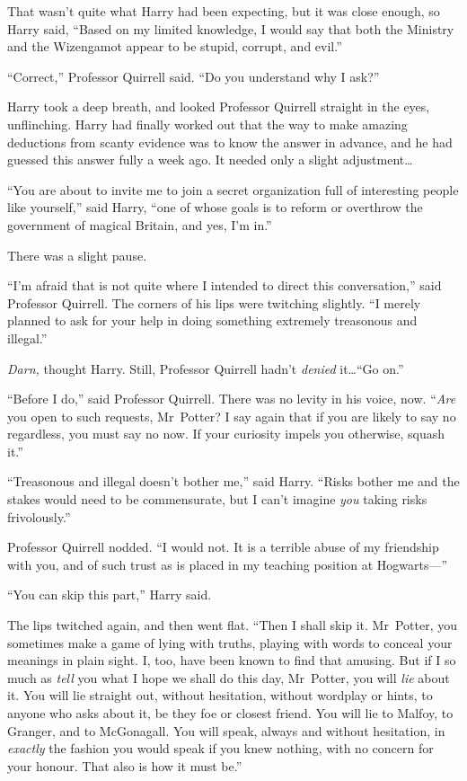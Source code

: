 That wasn’t quite what Harry had been expecting, but it was close enough, so Harry said,
“Based on my limited knowledge, I would say that both the Ministry and the Wizengamot appear to be stupid, corrupt, and evil.”

“Correct,” Professor Quirrell said.
“Do you understand why I ask?”

Harry took a deep breath, and looked Professor Quirrell straight in the eyes, unflinching. Harry had finally worked out that the way to make amazing deductions from scanty evidence was to know the answer in advance, and he had guessed this answer fully a week ago. It needed only a slight adjustment…

“You are about to invite me to join a secret organization full of interesting people like yourself,” said Harry, “one of whose goals is to reform or overthrow the government of magical Britain, and yes, I’m in.”

There was a slight pause.

“I’m afraid that is not quite where I intended to direct this conversation,” said Professor Quirrell. The corners of his lips were twitching slightly.
“I merely planned to ask for your help in doing something extremely treasonous and illegal.”

\emph{Darn,} thought Harry. Still, Professor Quirrell hadn’t \emph{denied} it…“Go on.”

“Before I do,” said Professor Quirrell. There was no levity in his voice, now. “\emph{Are} you open to such requests, Mr~Potter? I say again that if you are likely to say no regardless, you must say no now. If your curiosity impels you otherwise, squash it.”

“Treasonous and illegal doesn’t bother me,” said Harry.
“Risks bother me and the stakes would need to be commensurate, but I can’t imagine \emph{you} taking risks frivolously.”

Professor Quirrell nodded.
“I would not. It is a terrible abuse of my friendship with you, and of such trust as is placed in my teaching position at Hogwarts—”

“You can skip this part,” Harry said.

The lips twitched again, and then went flat.
“Then I shall skip it. Mr~Potter, you sometimes make a game of lying with truths, playing with words to conceal your meanings in plain sight. I, too, have been known to find that amusing. But if I so much as \emph{tell} you what I hope we shall do this day, Mr~Potter, you will \emph{lie} about it. You will lie straight out, without hesitation, without wordplay or hints, to anyone who asks about it, be they foe or closest friend. You will lie to Malfoy, to Granger, and to McGonagall. You will speak, always and without hesitation, in \emph{exactly} the fashion you would speak if you knew nothing, with no concern for your honour. That also is how it must be.”

